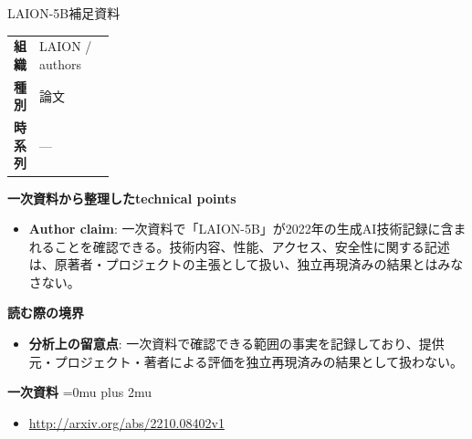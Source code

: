 \begin{technicalnote}{LAION-5B}{補足資料}
\begingroup
\begin{tabularx}{\linewidth}{@{}>{\bfseries}p{0.22\linewidth}X@{}}
組織 & LAION / authors \\
種別 & 論文 \\
時系列 & — \\
\end{tabularx}
\smallskip
{\bfseries 一次資料から整理したtechnical points}
\begin{itemize}[leftmargin=1.5em,itemsep=0.35em]
\item \textbf{Author claim}: 一次資料で「LAION-5B」が2022年の生成AI技術記録に含まれることを確認できる。技術内容、性能、アクセス、安全性に関する記述は、原著者・プロジェクトの主張として扱い、独立再現済みの結果とはみなさない。
\end{itemize}
\begin{minipage}{\linewidth}
{\bfseries 読む際の境界}
\begin{itemize}[leftmargin=1.5em,itemsep=0.35em]
\item \textbf{分析上の留意点}: 一次資料で確認できる範囲の事実を記録しており、提供元・プロジェクト・著者による評価を独立再現済みの結果として扱わない。
\end{itemize}
\begin{samepage}
{\bfseries 一次資料}
\begingroup\sloppy
\Urlmuskip=0mu plus 2mu\relax
\begin{itemize}[leftmargin=1.5em,itemsep=0.25em]
\item {\scriptsize\url{http://arxiv.org/abs/2210.08402v1}}
\end{itemize}
\endgroup
\end{samepage}
\end{minipage}
\endgroup
\end{technicalnote}
\medskip

